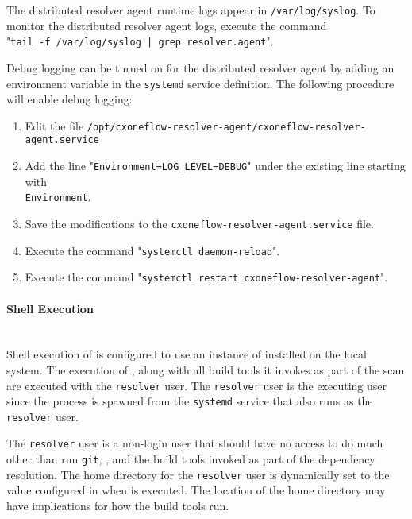 The distributed resolver agent runtime logs appear in \texttt{/var/log/syslog}.  To monitor the distributed resolver agent logs, execute the command
\\"\texttt{tail -f /var/log/syslog | grep resolver.agent}".

Debug logging can be turned on for the distributed resolver agent by adding an environment variable in the \texttt{systemd}
service definition.  The following procedure will enable debug logging:

\begin{enumerate}
  \item Edit the file \texttt{/opt/cxoneflow-resolver-agent/cxoneflow-resolver-agent.service}
  \item Add the line "\texttt{Environment=LOG\_LEVEL=DEBUG}" under the existing line starting with\\\texttt{Environment}.
  \item Save the modifications to the \texttt{cxoneflow-resolver-agent.service} file.
  \item Execute the command "\texttt{systemctl daemon-reload}".
  \item Execute the command "\texttt{systemctl restart cxoneflow-resolver-agent}".
\end{enumerate}

\paragraph{Shell Execution}\label{par:agent-shell-execution}

\noindent\\Shell execution of \scaresolver is configured to use an instance of \scaresolver installed on the local system.
The execution of \scaresolverns, along with all build tools it invokes as part of the scan are executed with the \texttt{resolver}
user.  The \texttt{resolver} user is the executing user since the process is spawned from the \texttt{systemd} service that also
runs as the \texttt{resolver} user.

The \texttt{resolver} user is a non-login user that should have no access to do much other than run \texttt{git}, \scaresolverns, and
the build tools invoked as part of the dependency resolution.  The home directory for the \texttt{resolver} user is dynamically set
to the value configured in  when \scaresolver is executed.  The location
of the home directory may have implications for how the build tools run.

